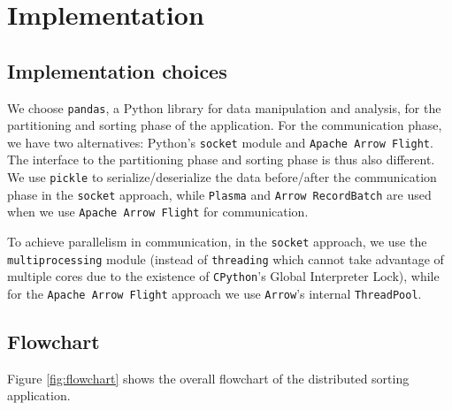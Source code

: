 \documentclass{article}
\begin{document}
\section{Implementation}
\label{sec:implementation}

\subsection{Implementation choices}
We choose \texttt{pandas}, a Python library for data manipulation and analysis, 
for the partitioning and sorting phase of the application.
For the communication phase, we have two alternatives: Python's \texttt{socket} module and \texttt{Apache Arrow Flight}.
The interface to the partitioning phase and sorting phase is thus also different.
We use \texttt{pickle} to serialize/deserialize the data before/after the communication phase in the \texttt{socket} approach,
while \texttt{Plasma} and \texttt{Arrow RecordBatch} are used when we use \texttt{Apache Arrow Flight} for communication.

To achieve parallelism in communication, in the \texttt{socket} approach, we use the \texttt{multiprocessing} module 
(instead of \texttt{threading} which cannot take advantage of multiple cores due to the existence of \texttt{CPython}'s Global Interpreter Lock),
while for the \texttt{Apache Arrow Flight} approach we use \texttt{Arrow}'s internal \texttt{ThreadPool}.

\subsection{Flowchart}

Figure \ref{fig:flowchart} shows the overall flowchart of the distributed sorting application.
\end{document}
